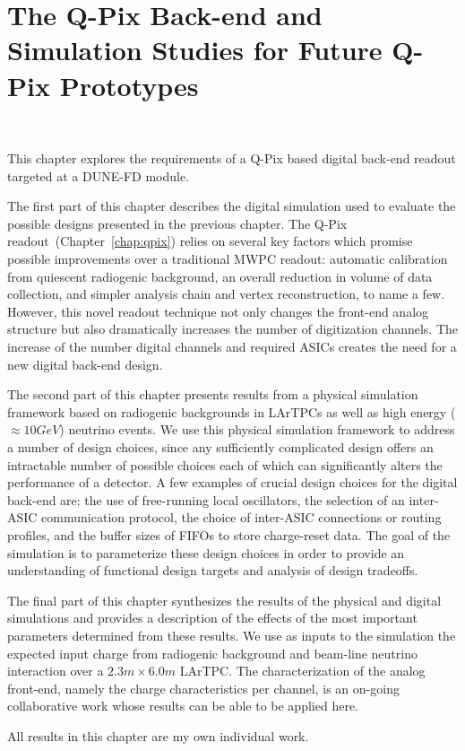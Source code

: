 \chapter{The Q-Pix Back-end and Simulation Studies for Future Q-Pix Prototypes}~\label{chap:sim}

This chapter explores the requirements of a Q-Pix based digital back-end readout targeted at a DUNE-FD module.

The first part of this chapter describes the digital simulation used to evaluate the possible designs presented in the previous chapter.
The Q-Pix readout~(Chapter~\ref{chap:qpix}) relies on several key factors which promise possible improvements over a traditional MWPC readout: automatic calibration from quiescent radiogenic background, an overall reduction in volume of data collection, and simpler analysis chain and vertex reconstruction, to name a few.
However, this novel readout technique not only changes the front-end analog structure but also dramatically increases the number of digitization channels.
The increase of the number digital channels and required ASICs creates the need for a new digital back-end design.

The second part of this chapter presents results from a physical simulation framework based on radiogenic backgrounds in LArTPCs as well as high energy ($\approx 10\unit{GeV}$) neutrino events.
We use this physical simulation framework to address a number of design choices, since any sufficiently complicated design offers an intractable number of possible choices each of which can significantly alters the performance of a detector.
A few examples of crucial design choices for the digital back-end are: the use of free-running local oscillators, the selection of an inter-ASIC communication protocol, the choice of inter-ASIC connections or routing profiles, and the buffer sizes of FIFOs to store charge-reset data.
The goal of the simulation is to parameterize these design choices in order to provide an understanding of functional design targets and analysis of design tradeoffs.

The final part of this chapter synthesizes the results of the physical and digital simulations and provides a description of the effects of the most important parameters determined from these results.
We use as inputs to the simulation the expected input charge from radiogenic background and beam-line neutrino interaction over a $2.3 \unit{m} \times 6.0 \unit{m}$ LArTPC.
The characterization of the analog front-end, namely the charge characteristics per channel, is an on-going collaborative work whose results can be able to be applied here.

All results in this chapter are my own individual work.







